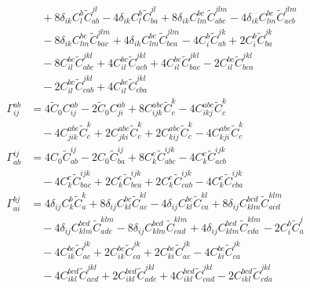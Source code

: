 \begin{align}
&\quad {}+ 8 \delta_{ik} C^{b}_{l} \widetilde{C}^{jl}_{ab} - 4 \delta_{ik} C^{b}_{l} \widetilde{C}^{jl}_{ba} + 8 \delta_{ik} C^{bc}_{lm} \widetilde{C}^{jlm}_{abc} - 4 \delta_{ik} C^{bc}_{lm} \widetilde{C}^{jlm}_{acb} \\
&\quad -8 \delta_{ik} C^{bc}_{lm} \widetilde{C}^{jlm}_{bac} + 4 \delta_{ik} C^{bc}_{lm} \widetilde{C}^{jlm}_{bca} - 4 C^{b}_{i} \widetilde{C}^{jk}_{ab} + 2 C^{b}_{i} \widetilde{C}^{jk}_{ba} \\
&\quad -8 C^{bc}_{il} \widetilde{C}^{jkl}_{abc} + 4 C^{bc}_{il} \widetilde{C}^{jkl}_{acb} + 4 C^{bc}_{il} \widetilde{C}^{jkl}_{bac} - 2 C^{bc}_{il} \widetilde{C}^{jkl}_{bca} \\
&\quad -2 C^{bc}_{il} \widetilde{C}^{jkl}_{cab} + 4 C^{bc}_{il} \widetilde{C}^{jkl}_{cba} \\
\Gamma^{ab}_{ij} &= 4 \widetilde{C}_{0} C^{ab}_{ij} - 2 \widetilde{C}_{0} C^{ab}_{ji} + 8 C^{abc}_{ijk} \widetilde{C}^{k}_{c} - 4 C^{abc}_{ikj} \widetilde{C}^{k}_{c} \\
&\quad -4 C^{abc}_{jik} \widetilde{C}^{k}_{c} + 2 C^{abc}_{jki} \widetilde{C}^{k}_{c} + 2 C^{abc}_{kij} \widetilde{C}^{k}_{c} - 4 C^{abc}_{kji} \widetilde{C}^{k}_{c} \\
\Gamma^{ij}_{ab} &= 4 C_{0} \widetilde{C}^{ij}_{ab} - 2 C_{0} \widetilde{C}^{ij}_{ba} + 8 C^{c}_{k} \widetilde{C}^{ijk}_{abc} - 4 C^{c}_{k} \widetilde{C}^{ijk}_{acb} \\
&\quad -4 C^{c}_{k} \widetilde{C}^{ijk}_{bac} + 2 C^{c}_{k} \widetilde{C}^{ijk}_{bca} + 2 C^{c}_{k} \widetilde{C}^{ijk}_{cab} - 4 C^{c}_{k} \widetilde{C}^{ijk}_{cba} \\
\Gamma^{bj}_{ai} &= 4 \delta_{ij} C^{b}_{k} \widetilde{C}^{k}_{a} + 8 \delta_{ij} C^{bc}_{kl} \widetilde{C}^{kl}_{ac} - 4 \delta_{ij} C^{bc}_{kl} \widetilde{C}^{kl}_{ca} + 8 \delta_{ij} C^{bcd}_{klm} \widetilde{C}^{klm}_{acd} \\
&\quad -4 \delta_{ij} C^{bcd}_{klm} \widetilde{C}^{klm}_{adc} - 8 \delta_{ij} C^{bcd}_{klm} \widetilde{C}^{klm}_{cad} + 4 \delta_{ij} C^{bcd}_{klm} \widetilde{C}^{klm}_{cda} - 2 C^{b}_{i} \widetilde{C}^{j}_{a} \\
&\quad -4 C^{bc}_{ik} \widetilde{C}^{jk}_{ac} + 2 C^{bc}_{ik} \widetilde{C}^{jk}_{ca} + 2 C^{bc}_{ki} \widetilde{C}^{jk}_{ac} - 4 C^{bc}_{ki} \widetilde{C}^{jk}_{ca} \\
&\quad -4 C^{bcd}_{ikl} \widetilde{C}^{jkl}_{acd} + 2 C^{bcd}_{ikl} \widetilde{C}^{jkl}_{adc} + 4 C^{bcd}_{ikl} \widetilde{C}^{jkl}_{cad} - 2 C^{bcd}_{ikl} \widetilde{C}^{jkl}_{cda} \\

\end{align}

